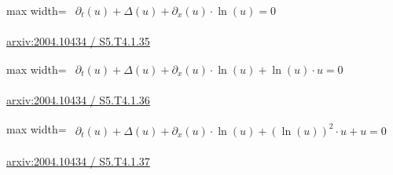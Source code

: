 \documentclass[10pt,a4paper]{article}
\begin{document}
\begin{minipage}{\linewidth}
\begin{center}\begin{adjustbox}{max width=\linewidth}$\displaystyle\begin{gathered}\begin{gathered}\partial_{t}(u)+\Delta(u)+\partial_{x}(u)\cdot \ln(u)=0\end{gathered}\end{gathered}$\end{adjustbox}\end{center}
{\small \href{https://arxiv.org/html/2004.10434#S5.T4.1.35}{arxiv:2004.10434 / S5.T4.1.35}}\par
\end{minipage}\par\vspace{7mm}

\begin{minipage}{\linewidth}
\begin{center}\begin{adjustbox}{max width=\linewidth}$\displaystyle\begin{gathered}\begin{gathered}\partial_{t}(u)+\Delta(u)+\partial_{x}(u)\cdot \ln(u)+\ln(u)\cdot u=0\end{gathered}\end{gathered}$\end{adjustbox}\end{center}
{\small \href{https://arxiv.org/html/2004.10434#S5.T4.1.36}{arxiv:2004.10434 / S5.T4.1.36}}\par
\end{minipage}\par\vspace{7mm}

\begin{minipage}{\linewidth}
\begin{center}\begin{adjustbox}{max width=\linewidth}$\displaystyle\begin{gathered}\begin{gathered}\partial_{t}(u)+\Delta(u)+\partial_{x}(u)\cdot \ln(u)+(\ln(u))^{2}\cdot u+u=0\end{gathered}\end{gathered}$\end{adjustbox}\end{center}
{\small \href{https://arxiv.org/html/2004.10434#S5.T4.1.37}{arxiv:2004.10434 / S5.T4.1.37}}\par
\end{minipage}\par\vspace{7mm}
\end{document}

